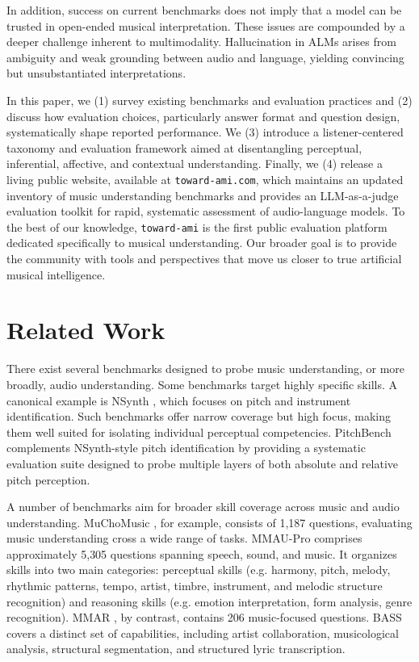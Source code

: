 \documentclass[conference,a4paper]{APSIPA2026}
\begin{document}
In addition, success on current benchmarks does not imply that a model can be trusted in open-ended musical interpretation. These issues are compounded by a deeper challenge inherent to multimodality. Hallucination in ALMs arises from ambiguity and weak grounding between audio and language, yielding convincing but unsubstantiated interpretations.

In this paper, we (1) survey existing benchmarks and evaluation practices and (2) discuss how evaluation choices, particularly answer format and question design, systematically shape reported performance. We (3) introduce a listener-centered taxonomy and evaluation framework aimed at disentangling perceptual, inferential, affective, and contextual understanding. Finally, we (4) release a living public website, available at \texttt{toward-ami.com}, which maintains an updated inventory of music understanding benchmarks and provides an LLM-as-a-judge evaluation toolkit for rapid, systematic assessment of audio-language models. To the best of our knowledge, \texttt{toward-ami} is the first public evaluation platform dedicated specifically to musical understanding. Our broader goal is to provide the community with tools and perspectives that move us closer to true artificial musical intelligence.

\section{Related Work}

There exist several benchmarks designed to probe music understanding, or more broadly, audio understanding. Some benchmarks target highly specific skills. A canonical example is NSynth \cite{nsynth2017}, which focuses on pitch and instrument identification. Such benchmarks offer narrow coverage but high focus, making them well suited for isolating individual perceptual competencies. PitchBench \cite{dujardinPitchBenchMeasuringPitch2026} complements NSynth-style pitch identification by providing a systematic evaluation suite designed to probe multiple layers of both absolute and relative pitch perception.

A number of benchmarks aim for broader skill coverage across music and audio understanding. MuChoMusic \cite{weckMuChoMusicEvaluatingMusic2024}, for example, consists of 1{,}187 questions, evaluating music understanding cross a wide range of tasks. MMAU-Pro \cite{kumarMMAUProChallengingComprehensive2025} comprises approximately 5{,}305 questions spanning speech, sound, and music. It organizes skills into two main categories: perceptual skills (e.g. harmony, pitch, melody, rhythmic patterns, tempo, artist, timbre, instrument, and melodic structure recognition) and reasoning skills (e.g. emotion interpretation, form analysis, genre recognition). MMAR \cite{maMMARChallengingBenchmark2025}, by contrast, contains 206 music-focused questions. BASS covers a distinct set of capabilities, including artist collaboration, musicological analysis, structural segmentation, and structured lyric transcription.
\end{document}
